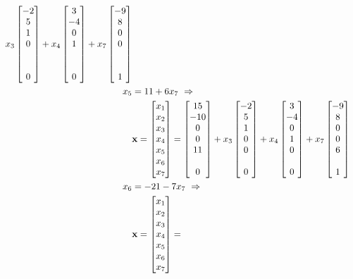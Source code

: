 \documentclass{ximera}
\begin{document}
\begin{example}
\begin{align*}
    x_3\colvector{-2\\ 5\\ 1\\ 0\\ \\ \\ 0}+
    x_4\colvector{3\\ -4\\ 0\\ 1\\ \\ \\ 0}+
    x_7\colvector{-9\\ 8\\ 0\\ 0\\ \\ \\ 1}\\
    x_5&=11+6x_7\ \Rightarrow\\&\vect{x}=
                                 \colvector{x_1\\x_2\\x_3\\x_4\\x_5\\x_6\\x_7}=
    \colvector{15\\ -10\\ 0\\ 0\\ 11\\ \\ 0}+
    x_3\colvector{-2\\ 5\\ 1\\ 0\\ 0\\ \\ 0}+
    x_4\colvector{3\\ -4\\ 0\\ 1\\ 0\\ \\ 0}+
    x_7\colvector{-9\\ 8\\ 0\\ 0\\ 6\\ \\ 1}\\
    x_6&=-21-7x_7\ \Rightarrow\\&\vect{x}=
                                  \colvector{x_1\\x_2\\x_3\\x_4\\x_5\\x_6\\x_7}=

\end{align*}
\end{example}
\end{document}
